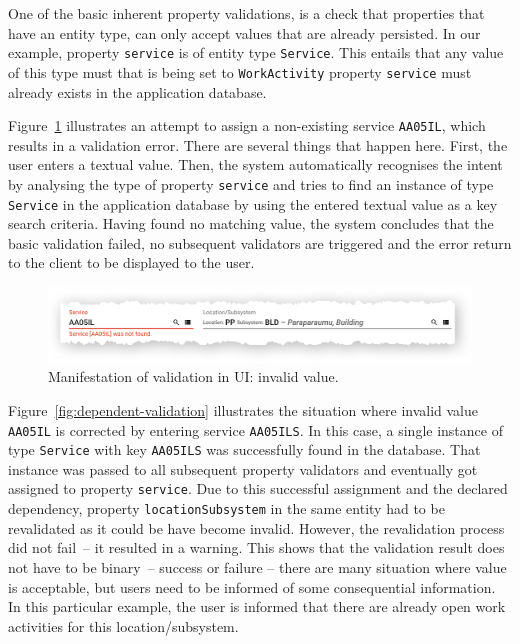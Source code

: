 \documentclass[a4paper,12pt,oneside,openright,final]{memoir} %
\begin{document}
	One of the basic inherent property validations, is a check that properties that have an entity type, can only accept values that are already persisted.
	In our example, property \texttt{service} is of entity type \texttt{Service}.
	This entails that any value of this type must that is being set to \texttt{WorkActivity} property \texttt{service} must already exists in the application database.
	
	Figure~\ref{fig:non-existing-service} illustrates an attempt to assign a non-existing service \texttt{AA05IL}, which results in a validation error.
	There are several things that happen here.
	First, the user enters a textual value.
	Then, the system automatically recognises the intent by analysing the type of property \texttt{service} and tries to find an instance of type \texttt{Service} in the application database by using the entered textual value as a key search criteria.
	Having found no matching value, the system concludes that the basic validation failed, no subsequent validators are triggered and the error return to the client to be displayed to the user.

	\begin{figure}[!h]
  		\centering
     	\includegraphics[width=1.0\textwidth]{images/02-wa-non-existing-service.png}  
  	  	\caption{Manifestation of validation in UI: invalid value.}
   		\label{fig:non-existing-service}
  	\end{figure}

	Figure~\ref{fig:dependent-validation} illustrates the situation where invalid value \texttt{AA05IL} is corrected by entering service \texttt{AA05ILS}.
	In this case, a single instance of type \texttt{Service} with key \texttt{AA05ILS} was successfully found in the database.
	That instance was passed to all subsequent property validators and eventually got assigned to property \texttt{service}.
	Due to this successful assignment and the declared dependency, property \texttt{locationSubsystem} in the same entity had to be revalidated as it could be have become invalid.
	However, the revalidation process did not fail~-- it resulted in a warning.
	This shows that the validation result does not have to be binary~-- success or failure -- there are many situation where value is acceptable, but users need to be informed of some consequential information.
	In this particular example, the user is informed that there are already open work activities for this location/subsystem.	
	
\end{document}
